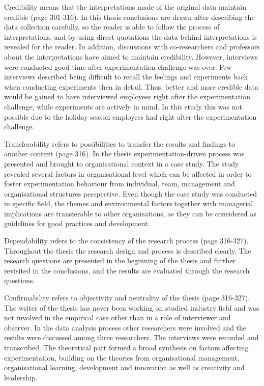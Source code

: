 Credibility means that the interpretations made of the original data maintain credible \citep{lincoln1985naturalistic} (page 301-316). In this thesis conclusions are drawn after describing the data collection carefully, so the reader is able to follow the process of interpretations, and by using direct quotations the data behind interpretations is revealed for the reader. In addition, discussions with co-researchers and professors about the interpretations have aimed to maintain credibility. However, interviews were conducted good time after experimentation challenge was over. Few interviews described being difficult to recall the feelings and experiments back when conducting experiments then in detail. Thus, better and more credible data would be gained to have interviewed employees right after the experimentation challenge, while experiments are actively in mind. In this study this was not possible due to the holiday season employees had right after the experimentation challenge. 

Transferability refers to possibilities to transfer the results and findings to another context \citep{lincoln1985naturalistic} (page 316). In the thesis experimentation-driven process was presented and brought to organisational context in a case study. The study revealed several factors in organisational level which can be affected in order to foster experimentation behaviour from individual, team, management and organisational structures perspective. Even though the case study was conducted in specific field, the themes and environmental factors together with managerial implications are transferable to other organisations, as they can be considered as guidelines for good practices and development. 

Dependability refers to the consistency of the research process \citep{lincoln1985naturalistic} (page 316-327). Throughout the thesis the research design and process is described clearly. The research questions are presented in the beginning of the thesis and further revisited in the conclusions, and the results are evaluated through the research questions. 

Confirmability refers to objectivity and neutrality of the thesis \citep{lincoln1985naturalistic} (page 316-327). The writer of the thesis has never been working on studied industry field and was not involved in the empirical case other than in a role of interviewer and observer. In the data analysis process other researchers were involved and the results were discussed among three researchers. The interviews were recorded and transcribed. The theoretical part formed a broad synthesis on factors affecting experimentation, building on the theories from organisational management, organisational learning, development and innovation as well as creativity and leadership. 

